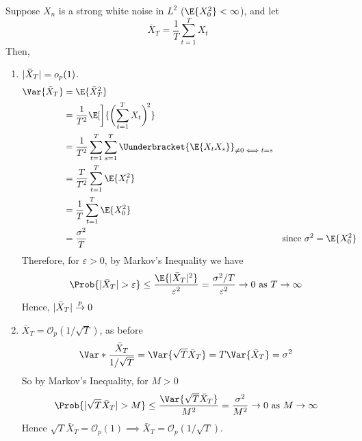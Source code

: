 \begin{Example}{}{}
    Suppose $ X_n $ is a strong white noise in $ L^2 $ ($ \E{X_0^2}<\infty $),
    and let
    \[ \bar{X}_T=\frac{1}{T} \sum_{t=1}^{T} X_t \]
    Then,
    \begin{enumerate}[(1)]
        \item $ \lvert\bar{X}_T\rvert=o_p(1) $.
              \begin{align*}
                  \Var{\bar{X}_T}
                   & =\E{\bar{X}_T^2}                                                                                                             \\
                   & =\frac{1}{T^2} \E[\bigg]{\biggl(\sum_{t=1}^{T} X_t\biggr)^{\!2}}                                                             \\
                   & =\frac{1}{T^2} \sum_{t=1}^{T} \sum_{s=1}^{T}\Uunderbracket{\E{X_t X_s}}_{\ne 0\iff t=s}                                      \\
                   & =\frac{T}{T^2} \sum_{t=1}^{T} \E{X_t^2}                                                                                      \\
                   & =\frac{1}{T} \sum_{t=1}^{T} \E{X_0^2}                                                                                        \\
                   & =\frac{\sigma^2}{T}                                                                     &  & \text{since }\sigma^2=\E{X_0^2}
              \end{align*}
              Therefore, for $ \varepsilon>0 $, by Markov's Inequality we have
              \[ \Prob{\abs{\bar{X}_T}>\varepsilon}\le \frac{\E{\abs{\bar{X}_T}^2}}{\varepsilon^2}=
                  \frac{\sigma^2/T}{\varepsilon^2}\to 0\text{ as }T\to\infty  \]
              Hence, $ \lvert\bar{X}_T\rvert\stackrel{p}{\to}0 $
        \item $ \bar{X}_T=\mathcal{O}_p(1/\sqrt{T}) $, as before
              \[ \Var*{\frac{\bar{X}_T}{1/\sqrt{T}}}=\Var{\sqrt{T}\bar{X}_T}=T\Var{\bar{X}_T}=\sigma^2 \]
              So by Markov's Inequality, for $ M>0 $
              \[ \Prob{\abs{\sqrt{T}\bar{X}_T}>M}\le \frac{\Var{\sqrt{T}\bar{X}_T}}{M^2}=\frac{\sigma^2}{M^2}
                  \to 0\text{ as }M\to\infty \]
              Hence $ \sqrt{T}\bar{X}_T=\mathcal{O}_p(1)\implies \bar{X}_T=\mathcal{O}_p(1/\sqrt{T}) $.
    \end{enumerate}
\end{Example}
